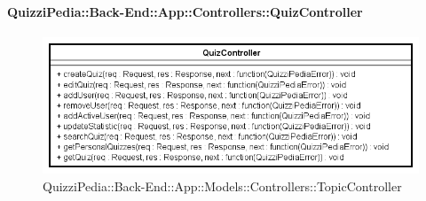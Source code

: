 \paragraph{QuizziPedia::Back-End::App::Controllers::QuizController}
\label{QuizziPedia::Back-End::App::Controllers::QuizController}
\begin{figure}[ht]
	\centering
	\includegraphics[scale=0.8]{UML/Classi/Back-End/QuizziPedia_Back-End_App_Controllers_quizController.png}
	\caption{QuizziPedia::Back-End::App::Models::Controllers::TopicController}
\end{figure}
\FloatBarrier

